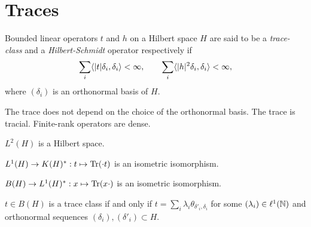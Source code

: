 \documentclass{../../large}
\begin{document}
\section{Traces}
\begin{prb}[Traces]
Bounded linear operators $t$ and $h$ on a Hilbert space $H$ are said to be a \emph{trace-class} and a \emph{Hilbert-Schmidt} operator respectively if
\[\sum_i\langle|t|\delta_i,\delta_i\rangle<\infty,\qquad\sum_i\langle|h|^2\delta_i,\delta_i\rangle<\infty,\]
where $(\delta_i)$ is an orthonormal basis of $H$.
\begin{parts}
\item
The trace does not depend on the choice of the orthonormal basis.
The trace is tracial.
Finite-rank operators are dense.
\item $L^2(H)$ is a Hilbert space.
\item $L^1(H)\to K(H)^*:t\mapsto\operatorname{Tr}(\cdot t)$ is an isometric isomorphism.
\item $B(H)\to L^1(H)^*:x\mapsto\operatorname{Tr}(x\cdot)$ is an isometric isomorphism.
\item $t\in B(H)$ is a trace class if and only if $t=\sum_i\lambda_i\theta_{\delta'_i,\delta_i}$ for some $(\lambda_i)\in\ell^1(\mathbb{N})$ and orthonormal sequences $(\delta_i),(\delta'_i)\subset H$.
\end{parts}
\end{prb}
\end{document}
